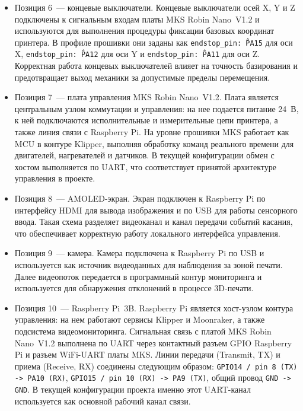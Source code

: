 \begin{itemize}
\item Позиция 6~--- концевые выключатели. Концевые выключатели осей X, Y и Z подключены к сигнальным входам платы MKS Robin Nano~V1.2 и используются для выполнения процедуры фиксации базовых координат принтера. В профиле прошивки они заданы как \texttt{endstop\_pin: \^PA15} для оси X, \texttt{endstop\_pin: \^PA12} для оси Y и \texttt{endstop\_pin: \^PA11} для оси Z. Корректная работа концевых выключателей влияет на точность базирования и предотвращает выход механики за допустимые пределы перемещения.

\item Позиция 7~--- плата управления MKS Robin Nano~V1.2. Плата является центральным узлом коммутации и управления: на нее подается питание 24~В, к ней подключаются исполнительные и измерительные цепи принтера, а также линия связи с Raspberry Pi. На уровне прошивки MKS работает как MCU в контуре Klipper, выполняя обработку команд реального времени для двигателей, нагревателей и датчиков. В текущей конфигурации обмен с хостом выполняется по UART, что соответствует принятой архитектуре управления в проекте.

\item Позиция 8~--- AMOLED-экран. Экран подключен к Raspberry Pi по интерфейсу HDMI для вывода изображения и по USB для работы сенсорного ввода. Такая схема разделяет видеоканал и канал передачи событий касания, что обеспечивает корректную работу локального интерфейса управления.

\item Позиция 9~--- камера. Камера подключена к Raspberry Pi по USB и используется как источник видеоданных для наблюдения за зоной печати. Далее видеопоток передается в программный контур мониторинга и используется для обнаружения отклонений в процессе 3D-печати.

\item Позиция 10~--- Raspberry Pi~3B. Raspberry Pi является хост-узлом контура управления: на нем работают сервисы Klipper и Moonraker, а также подсистема видеомониторинга. Сигнальная связь с платой MKS Robin Nano~V1.2 выполнена по UART через контактный разъем GPIO Raspberry Pi и разъем WiFi-UART платы MKS. Линии передачи (Transmit, TX) и приема (Receive, RX) соединены следующим образом: \texttt{GPIO14 / pin 8 (TX) -> PA10 (RX)}, \texttt{GPIO15 / pin 10 (RX) -> PA9 (TX)}, общий провод \texttt{GND -> GND}. В текущей конфигурации проекта именно этот UART-канал используется как основной рабочий канал связи.
\end{itemize}

